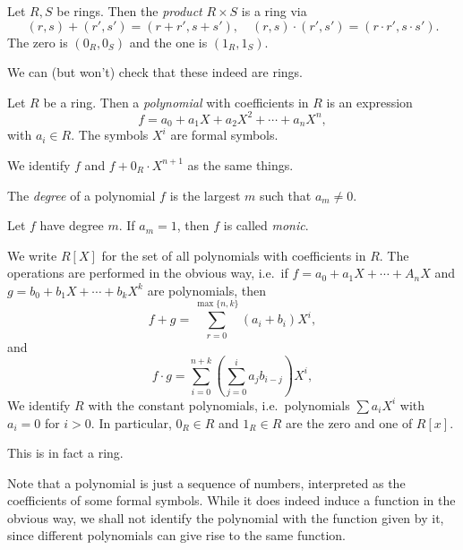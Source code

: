 \documentclass[a4paper]{article}
\begin{document}
\begin{defi}
  Let $R, S$ be rings. Then the \emph{product} $R \times S$ is a ring via
  \[
    (r, s) + (r', s') = (r + r', s + s'),\quad (r, s) \cdot (r', s') = (r\cdot r', s \cdot s').
  \]
  The zero is $(0_R, 0_S)$ and the one is $(1_R, 1_S)$.

  We can (but won't) check that these indeed are rings.
\end{defi}

\begin{defi}[Polynomial]
  Let $R$ be a ring. Then a \emph{polynomial} with coefficients in $R$ is an expression
  \[
    f = a_0 + a_1X + a_2 X^2 + \cdots + a_n X^n,
  \]
  with $a_i \in R$. The symbols $X^i$ are formal symbols.
\end{defi}
We identify $f$ and $f + 0_R \cdot X^{n + 1}$ as the same things.

\begin{defi}
  The \emph{degree} of a polynomial $f$ is the largest $m$ such that $a_m \not= 0$.
\end{defi}

\begin{defi}
  Let $f$ have degree $m$. If $a_m = 1$, then $f$ is called \emph{monic}.
\end{defi}

\begin{defi}
  We write $R[X]$ for the set of all polynomials with coefficients in $R$. The operations are performed in the obvious way, i.e.\ if $f = a_0 + a_1X + \cdots + A_n X$ and $g = b_0 + b_1X + \cdots + b_k X^k$ are polynomials, then
  \[
    f + g = \sum_{r = 0}^{\max\{n, k\}} (a_i + b_i) X^i,
  \]
  and
  \[
    f\cdot g = \sum_{i = 0}^{n + k} \left(\sum_{j = 0}^i a_j b_{i - j}\right) X^i,
  \]
  We identify $R$ with the constant polynomials, i.e.\ polynomials $\sum a_i X^i$ with $a_i = 0$ for $i > 0$. In particular, $0_R \in R$ and $1_R \in R$ are the zero and one of $R[x]$.
\end{defi}
This is in fact a ring.

Note that a polynomial is just a sequence of numbers, interpreted as the coefficients of some formal symbols. While it does indeed induce a function in the obvious way, we shall not identify the polynomial with the function given by it, since different polynomials can give rise to the same function.
\end{document}
